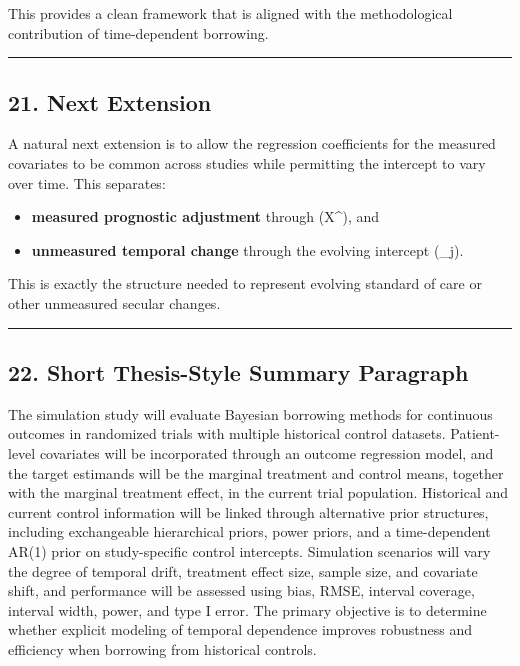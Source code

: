 \documentclass[
  letterpaper,
  DIV=11,
  numbers=noendperiod]{scrartcl}
\providecommand{\tightlist}{%
  \setlength{\itemsep}{0pt}\setlength{\parskip}{0pt}}
\begin{document}
This provides a clean framework that is aligned with the methodological
contribution of time-dependent borrowing.

\begin{center}\rule{0.5\linewidth}{0.5pt}\end{center}

\subsection{21. Next Extension}\label{next-extension}

A natural next extension is to allow the regression coefficients for the
measured covariates to be common across studies while permitting the
intercept to vary over time. This separates:

\begin{itemize}
\tightlist
\item
  \textbf{measured prognostic adjustment} through (X\^{}\top\beta), and
\item
  \textbf{unmeasured temporal change} through the evolving intercept
  (\alpha\_j).
\end{itemize}

This is exactly the structure needed to represent evolving standard of
care or other unmeasured secular changes.

\begin{center}\rule{0.5\linewidth}{0.5pt}\end{center}

\subsection{22. Short Thesis-Style Summary
Paragraph}\label{short-thesis-style-summary-paragraph}

The simulation study will evaluate Bayesian borrowing methods for
continuous outcomes in randomized trials with multiple historical
control datasets. Patient-level covariates will be incorporated through
an outcome regression model, and the target estimands will be the
marginal treatment and control means, together with the marginal
treatment effect, in the current trial population. Historical and
current control information will be linked through alternative prior
structures, including exchangeable hierarchical priors, power priors,
and a time-dependent AR(1) prior on study-specific control intercepts.
Simulation scenarios will vary the degree of temporal drift, treatment
effect size, sample size, and covariate shift, and performance will be
assessed using bias, RMSE, interval coverage, interval width, power, and
type I error. The primary objective is to determine whether explicit
modeling of temporal dependence improves robustness and efficiency when
borrowing from historical controls.
\end{document}
